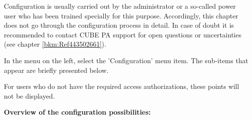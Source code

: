 Configuration is usually carried out by the administrator or a so-called power user who has been trained specially for this purpose. Accordingly, this chapter does not go through the configuration process in detail. In case of doubt it is recommended to contact CUBE PA support for open questions or uncertainties (see chapter \ref{bkm:Ref443502661}).

\vspace{\baselineskip}

In the menu on the left, select the 'Configuration' menu item. The sub-items that appear are briefly presented below.

\vspace{1.5cm} 

For users who do not have the required access authorizations, these points will not be displayed.

\vspace{3.5cm}  

\textbf{Overview of the configuration possibilities:}

\vspace{\baselineskip}

